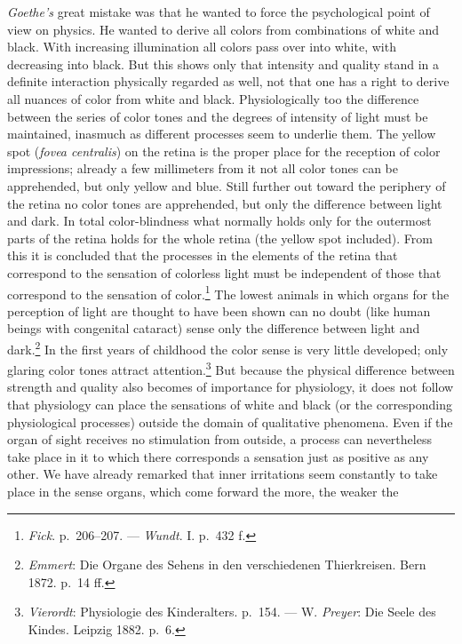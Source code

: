 \documentclass[12pt,a4paper]{book}
\newcommand{\opage}[1]{\marginnote{\footnotesize\textit{[#1]}}}
\begin{document}
\emph{Goethe's} great mistake was that he wanted to force the
psychological point of view on physics. He wanted to derive all colors
from combinations of white and black. With increasing illumination all
colors pass over into white, with decreasing into black. But this shows
only that intensity and quality stand in a definite interaction
physically regarded as well, not that one has a right to derive all
nuances of color from white and black. Physiologically too the
difference between the series of color tones and the degrees of
intensity of light must be maintained, inasmuch as different processes
seem to underlie them. The yellow spot (\textit{fovea centralis}) on
the retina is the proper place for the reception of color impressions;
already a few millimeters from it not all color tones can be
apprehended, but only yellow and blue. Still further out toward the
periphery of the retina no color tones are apprehended, but only the
difference between light and dark. In total color-blindness what
normally holds only for the outermost parts of the retina holds for the
whole retina (the yellow spot included). From this it is concluded that
the processes in the elements of the retina that correspond to the
sensation of colorless light must be independent of those that
correspond
to the sensation of color.\footnote{\emph{Fick}. p.~206--207. ---
\emph{Wundt}. I. p.~432 f.} The lowest animals in which organs for the
perception of light are thought to have been shown can no doubt (like
human beings with congenital cataract) sense only the difference between
light and
dark.\footnote{\emph{Emmert}: Die Organe des Sehens in den
verschiedenen Thierkreisen. Bern 1872. p.~14 ff.} In the first years of
childhood the color sense is very little developed; only glaring color
tones
\opage{137}attract attention.\footnote{\emph{Vierordt}: Physiologie des
Kinderalters. p.~154. --- W. \emph{Preyer}: Die Seele des Kindes.
Leipzig 1882. p.~6.} But because the physical difference between
strength and quality also becomes of importance for physiology, it does
not follow that physiology can place the sensations of white and black
(or the corresponding physiological processes) outside the domain of
qualitative phenomena. Even if the organ of sight receives no
stimulation from outside, a process can nevertheless take place in it to
which there corresponds a sensation just as positive as any other. We
have already remarked that inner irritations seem constantly to take
place in the sense organs, which come forward the more, the weaker the
\end{document}
